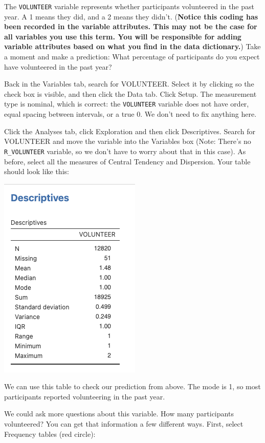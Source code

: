 \documentclass[
]{book}
\begin{document}
The \texttt{VOLUNTEER} variable represents whether participants volunteered in the past year. A 1 means they did, and a 2 means they didn't. (\textbf{Notice this coding has been recorded in the variable attributes. This may not be the case for all variables you use this term. You will be responsible for adding variable attributes based on what you find in the data dictionary.}) Take a moment and make a prediction: What percentage of participants do you expect have volunteered in the past year?

Back in the {Variables} tab, search for VOLUNTEER. Select it by clicking so the check box is visible, and then click the {Data} tab. Click {Setup}. The measurement type is nominal, which is correct: the \texttt{VOLUNTEER} variable does not have order, equal spacing between intervals, or a true 0. We don't need to fix anything here.

Click the {Analyses} tab, click {Exploration} and then click {Descriptives}. Search for VOLUNTEER and move the variable into the Variables box (Note: There's no \texttt{R\_VOLUNTEER} variable, so we don't have to worry about that in this case). As before, select all the measures of Central Tendency and Dispersion. Your table should look like this:

\includegraphics{img/volunteerresults.png}

We can use this table to check our prediction from above. The mode is 1, so most participants reported volunteering in the past year.

We could ask more questions about this variable. How many participants volunteered? You can get that information a few different ways. First, select Frequency tables (red circle):
\end{document}
